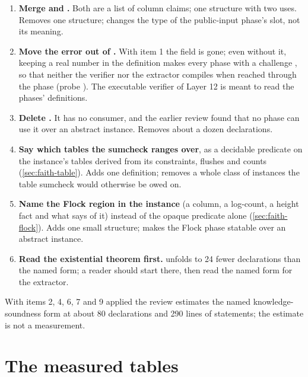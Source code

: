 \begin{enumerate}
  stays owed to whoever builds the opening.
\item \textbf{Merge  and .} Both are a list of column claims; one
  structure with two uses. Removes one structure; changes the type of the public-input phase's
  slot, not its meaning.
\item \textbf{Move the error out of .} With item 1 the field is gone; even
  without it, keeping a real number in the definition makes every phase with a challenge
  , so that neither the verifier nor the extractor compiles when reached
  through the phase (probe ). The executable verifier of Layer 12
  is meant to read the phases' definitions.
\item \textbf{Delete .} It has no consumer, and the earlier review found
  that no phase can use it over an abstract instance. Removes about a dozen declarations.
\item \textbf{Say which tables the sumcheck ranges over}, as a decidable predicate on the
  instance's tables derived from its constraints, flushes and counts (\cref{sec:faith-table}).
  Adds one definition; removes a whole class of instances the table sumcheck would otherwise be
  owed on.
\item \textbf{Name the Flock region in the instance} (a column, a log-count, a height fact and
  what  says of it) instead of the opaque predicate alone (\cref{sec:faith-flock}).
  Adds one small structure; makes the Flock phase statable over an abstract instance.
\item \textbf{Read the existential theorem first.} 
  unfolds to 24 fewer declarations than the named form; a reader should start there, then read
  the named form for the extractor.
\end{enumerate}

With items 2, 4, 6, 7 and 9 applied the review estimates the named knowledge-soundness form at
about 80 declarations and 290 lines of statements; the estimate is not a measurement.

\section{The measured tables}\label{sec:aud-tables}

